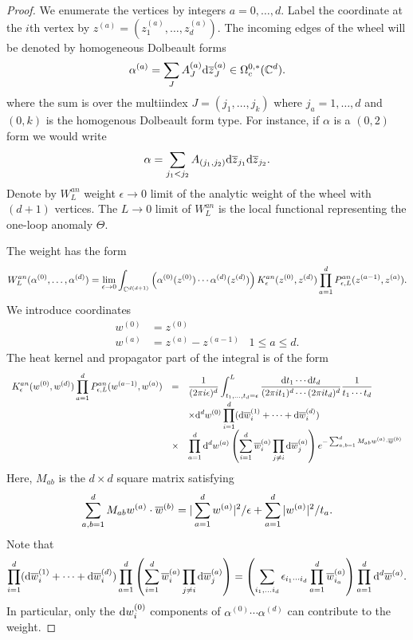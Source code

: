 \begin{proof}

We enumerate the vertices by integers $a = 0,\ldots, d$. 
Label the coordinate at the $i$th vertex by $z^{(a)} = (z_1^{(a)}, \ldots, z_d^{(a)})$. 
The incoming edges of the wheel will be denoted by homogeneous Dolbeault forms 
\[
\alpha^{(a)} = \sum_{J} A^{(a)}_J \d \zbar_J^{(a)} \in \Omega_c^{0,*}(\CC^d) .
\]
where the sum is over the multiindex $J = (j_1,\ldots, j_k)$ where $j_a = 1,\ldots, d$ and $(0,k)$ is the homogenous Dolbeault form type. 
For instance, if $\alpha$ is a $(0,2)$ form we would write
\[
\alpha = \sum_{j_1 < j_2} A_{(j_1,j_2)} \d \zbar_{j_1} \d\zbar_{j_2} .
\]
Denote by $W^{an}_L$ weight $\epsilon \to 0$ limit of the analytic weight of the wheel with $(d+1)$ vertices.
The $L\to 0$ limit of $W^{an}_L$ is the local functional representing the one-loop anomaly $\Theta$. 

The weight has the form
\[
W^{an}_L(\alpha^{(0)},\ldots,\alpha^{(d)}) = \lim_{\epsilon \to 0} \int_{\CC^{d(d+1)}} \left(\alpha^{(0)}(z^{(0)}) \cdots \alpha^{(d)}(z^{(d)}) \right) K^{an}_\epsilon(z^{(0)},z^{(d)}) \prod_{a =1}^d P^{an}_{\epsilon,L} (z^{(a-1)}, z^{(a)}) .
\]
We introduce coordinates
\begin{align*}
w^{(0)} & = z^{(0)} \\
w^{(a)} & = z^{(a)} - z^{(a-1)} \;\;\; 1 \leq a \leq d .
\end{align*}
The heat kernel and propagator part of the integral is of the form
\[
\begin{array}{ccl}
\displaystyle
K^{an}_\epsilon(w^{(0)},w^{(d)}) \prod_{a =1}^d P^{an}_{\epsilon,L} (w^{(a-1)}, w^{(a)}) & = & \displaystyle \frac{1}{(2 \pi i \epsilon)^d} \int_{t_1,\ldots,t_d = \epsilon}^L \frac{\d t_1 \cdots \d t_d}{(2 \pi i t_1)^d \cdots (2 \pi i t_d)^d} \frac{1}{t_1\cdots t_d}  \\ & & \displaystyle \times \d^d w^{(0)} \prod_{i=1}^d (\d \Bar{w}^{(1)}_i + \cdots + \d \Bar{w}^{(d)}_i) \\ & \times &  \displaystyle \prod_{a = 1}^d \d^d w^{(a)} \left(\sum_{i = 1}^d \Bar{w}_i^{(a)} \prod_{j \ne i} \d \Bar{w}_{j}^{(a)}\right) e^{-\sum_{a,b = 1}^d M_{a b} w^{(a)} \cdot \Bar{w}^{(b)}}
\end{array}
\]
Here, $M_{ab}$ is the $d \times d$ square matrix satisfying
\[
\sum_{a,b = 1}^d M_{a b} w^{(a)} \cdot \Bar{w}^{(b)} = |\sum_{a = 1}^d w^{(a)} |^2 / \epsilon + \sum_{a = 1}^d |w^{(a)}|^2 / t_a .
\]
Note that
\[
\prod_{i=1}^d (\d \Bar{w}^{(1)}_i + \cdots + \d \Bar{w}^{(d)}_i) \prod_{a = 1}^d \left(\sum_{i = 1}^d \Bar{w}_i^{(a)} \prod_{j \ne i} \d \Bar{w}_{j}^{(a)}\right) = \left( \sum_{i_1,\ldots i_d} \epsilon_{i_1\cdots i_d} \prod_{a=1}^d \Bar{w}^{(a)}_{i_a}\right) \prod_{a=1}^d \d^d \Bar{w}^{(a)} .
\]
In particular, only the $\d w_i^{(0)}$ components of $\alpha^{(0)} \cdots \alpha^{(d)}$ can contribute to the weight.


\end{proof}
